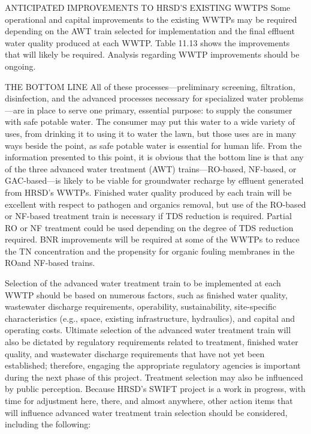 \documentclass{article}
\begin{document}
ANTICIPATED IMPROVEMENTS TO HRSD'S EXISTING WWTPS Some operational and
capital improvements to the existing WWTPs may be required depending on
the AWT train selected for implementation and the final effluent water
quality produced at each WWTP. Table 11.13 shows the improvements that
will likely be required. Analysis regarding WWTP improvements should be
ongoing.

THE BOTTOM LINE All of these processes---preliminary screening,
filtration, disinfection, and the advanced processes necessary for
specialized water problems---are in place to serve one primary,
essential purpose: to supply the consumer with safe potable water. The
consumer may put this water to a wide variety of uses, from drinking it
to using it to water the lawn, but those uses are in many ways beside
the point, as safe potable water is essential for human life. From the
information presented to this point, it is obvious that the bottom line
is that any of the three advanced water treatment (AWT)
trains---RO-based, NF-based, or GAC-based---is likely to be viable for
groundwater recharge by effluent generated from HRSD's WWTPs. Finished
water quality produced by each train will be excellent with respect to
pathogen and organics removal, but use of the RO-based or NF-based
treatment train is necessary if TDS reduction is required. Partial RO or
NF treatment could be used depending on the degree of TDS reduction
required. BNR improvements will be required at some of the WWTPs to
reduce the TN concentration and the propensity for organic fouling
membranes in the ROand NF-based trains.

Selection of the advanced water treatment train to be implemented at
each WWTP should be based on numerous factors, such as finished water
quality, wastewater discharge requirements, operability, sustainability,
site-specific characteristics (e.g., space, existing infrastructure,
hydraulics), and capital and operating costs. Ultimate selection of the
advanced water treatment train will also be dictated by regulatory
requirements related to treatment, finished water quality, and
wastewater discharge requirements that have not yet been established;
therefore, engaging the appropriate regulatory agencies is important
during the next phase of this project. Treatment selection may also be
influenced by public perception. Because HRSD's SWIFT project is a work
in progress, with time for adjustment here, there, and almost anywhere,
other action items that will influence advanced water treatment train
selection should be considered, including the following:
\end{document}
